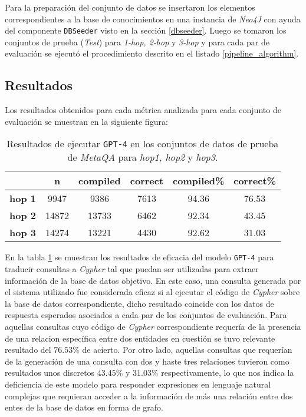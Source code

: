 Para la preparación del conjunto de datos se insertaron los elementos correspondientes a la base de conocimientos en una instancia de \textit{Neo4J} con ayuda del componente \texttt{DBSeeder} visto en la sección \ref{dbseeder}. Luego se tomaron los conjuntos de prueba (\textit{Test}) para \textit{1-hop, 2-hop} y \textit{3-hop} y para cada par de evaluación se ejecutó el procedimiento descrito en el listado \ref{pipeline_algorithm}.

\subsection{Resultados}

Los resultados obtenidos para cada métrica analizada para cada conjunto de evaluación se muestran en la siguiente figura:

\begin{table}[H]
\centering
\begin{tabular}{|c|c|c|c|c|c|}
\hline
 & \textbf{n} & \textbf{compiled} & \textbf{correct} & \textbf{compiled\%} & \textbf{correct\%} \\ \hline
\textbf{hop 1} & 9947 & 9386  & 7613 & 94.36 & 76.53  \\ \hline
\textbf{hop 2} & 14872 & 13733  & 6462 & 92.34  & 43.45  \\ \hline
\textbf{hop 3} & 14274 & 13221  & 4430 & 92.62 & 31.03  \\ \hline
\end{tabular}
\caption{Resultados de ejecutar \texttt{GPT-4} en los conjuntos de datos de prueba de \textit{MetaQA} para \textit{hop1, hop2} y \textit{hop3}.}
\label{tab:results1}
\end{table}

En la tabla \ref{tab:results1} se muestran los resultados de eficacia del modelo \texttt{GPT-4} para traducir consultas a \textit{Cypher} tal que puedan ser utilizadas para extraer información de la base de datos objetivo. En este caso, una consulta generada por el sistema utilizado fue considerada eficaz si al ejecutar el código de \textit{Cypher} sobre la base de datos correspondiente, dicho resultado coincide con los datos de respuesta esperados asociados a cada par de los conjuntos de evaluación. Para aquellas consultas cuyo código de \textit{Cypher} correspondiente requería de la presencia de una relacion específica entre dos entidades en cuestión se tuvo relevante resultado del $76.53\%$ de acierto. Por otro lado, aquellas consultas que requerían de la generación de una consulta con dos y haste tres relaciones tuvieron como resultados unos discretos $43.45\%$ y $31.03\%$ respectivamente, lo que nos indica la deficiencia de este modelo para responder expresiones en lenguaje natural complejas que requieran acceder a la información de más una relación entre dos entes de la base de datos en forma de grafo.

